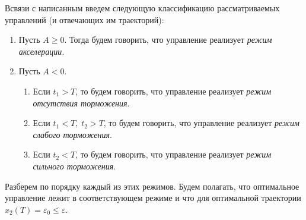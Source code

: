 Всвязи с написанным введем следующую классификацию рассматриваемых управлений (и отвечающих им траекторий):
\begin{enumerate}
        \item Пусть $A \geqslant 0$. Тогда будем говорить, что управление реализует \textit{режим акселерации}.
        \item Пусть $A < 0$.
        \begin{enumerate}
                \item Если $t_1 > T$, то будем говорить, что управление реализует \textit{режим отсутствия торможения}.
                \item Если $t_1 < T, \; t_2 > T$, то будем говорить, что управление реализует \textit{режим слабого торможения}.
                \item Если $t_2 < T$, то будем говорить, что управление реализует \textit{режим сильного торможения}.
        \end{enumerate}
\end{enumerate}

Разберем по порядку каждый из этих режимов. Будем полагать, что оптимальное управление лежит в соответствующем режиме и что для оптимальной траектории $x_2(T) = \varepsilon_0 \leqslant \varepsilon$.



